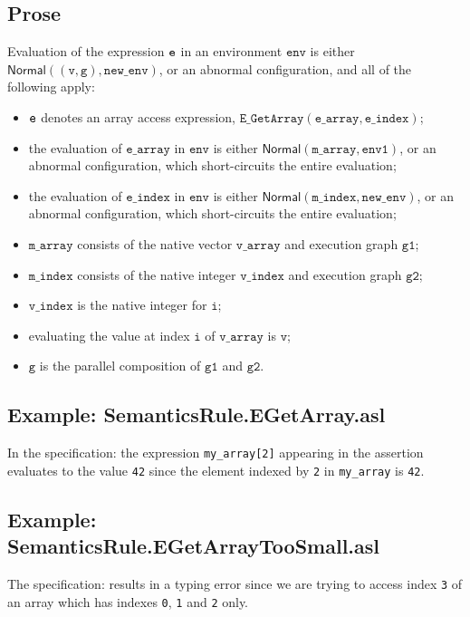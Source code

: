 \documentclass{book}
\newcommand\ProseOrAbnormal[0]{or an abnormal configuration, which short-circuits the entire evaluation}
\newcommand\Normal[0]{\textsf{Normal}}
\newcommand\newenv[0]{\texttt{new\_env}}
\newcommand\env[0]{\texttt{env}}
\newcommand\envone[0]{\texttt{env1}}
\newcommand\vi[0]{\texttt{i}}
\newcommand\vg[0]{\texttt{g}}
\newcommand\vv[0]{\texttt{v}}
\newcommand\vgone[0]{\texttt{g1}}
\newcommand\vgtwo[0]{\texttt{g2}}
\newcommand\earray[0]{\texttt{e\_array}}
\newcommand\eindex[0]{\texttt{e\_index}}
\newcommand\marray[0]{\texttt{m\_array}}
\newcommand\mindex[0]{\texttt{m\_index}}
\newcommand\varray[0]{\texttt{v\_array}}
\newcommand\vindex[0]{\texttt{v\_index}}
\begin{document}
  \subsection{Prose}
  Evaluation of the expression $\texttt{e}$ in an environment $\env$ is either \\
  $\Normal((\vv, \vg), \newenv)$, or an abnormal configuration, and all of the following apply:
  \begin{itemize}
  \item $\texttt{e}$ denotes an array access expression, $\texttt{E\_GetArray}(\earray, \eindex)$;
  \item the evaluation of $\earray$ in $\env$ is either $\Normal(\marray, \envone)$,
  \ProseOrAbnormal;
  \item the evaluation of $\eindex$ in $\env$ is either  $\Normal(\mindex, \newenv)$,
  \ProseOrAbnormal;
  \item $\marray$ consists of the native vector $\varray$ and execution graph $\vgone$;
  \item $\mindex$ consists of the native integer $\vindex$ and execution graph $\vgtwo$;
  \item $\vindex$ is the native integer for $\vi$;
  \item evaluating the value at index $\vi$ of $\varray$ is $\vv$;
  \item $\vg$ is the parallel composition of $\vgone$ and $\vgtwo$.
  \end{itemize}

  \subsection{Example: SemanticsRule.EGetArray.asl}
    In the specification:
    the expression \texttt{my\_array[2]} appearing in the assertion evaluates to the value \texttt{42} since the element
    indexed by \texttt{2} in \texttt{my\_array} is \texttt{42}.

  \subsection{Example: SemanticsRule.EGetArrayTooSmall.asl}
    The specification:
    results in a typing error since we are trying to access index \texttt{3} of an array
    which has indexes \texttt{0}, \texttt{1} and \texttt{2} only.
\end{document}
